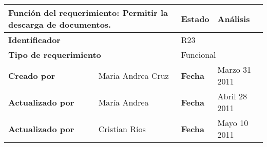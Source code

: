 %
\begin{center}
\begin{longtable}{|p{}|p{}|p{}|p{}|}
\hline
\multicolumn{2}{|p{0.45\textwidth}|}{{\bf {Función del requerimiento:}}
Permitir la descarga de documentos. } & {\bf{ Estado}} & Análisis \\
\hline
\multicolumn{2}{|p{0.45\textwidth}}{\bf Identificador} &
\multicolumn{2}{|p{0.45\textwidth}|}{R23} \\
\hline
\multicolumn{2}{|p{0.45\textwidth}}{\bf {Tipo de requerimiento}} &
\multicolumn{2}{|p{0.45\textwidth}|}{Funcional}\\
\hline
\bf {Creado por} & Maria Andrea Cruz & \bf {Fecha  } & Marzo 31 2011\\
\hline
\bf {Actualizado por} & María Andrea   & \bf {Fecha   }& Abril 28 2011\\
\hline
\bf {Actualizado por} & Cristian Ríos   & \bf {Fecha   }& Mayo 10 2011\\


\end{longtable}
\end{center}
